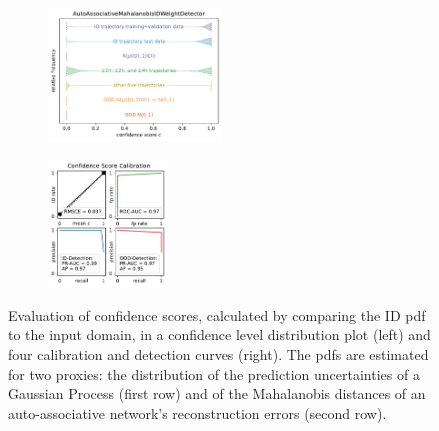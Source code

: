 \begin{figure}[H]
    \begin{subfigure}
        \centering
        \includegraphics[width=0.505\textwidth,valign=t]{ood-detection/figures/confidence-score/ood.autoassociativemahalanobisidweightdetector-distribution.pdf}
    \end{subfigure}
    \begin{subfigure}
        \centering
        \includegraphics[width=0.345\textwidth,valign=t]{ood-detection/figures/confidence-score/ood.autoassociativemahalanobisidweightdetector-calibration.pdf}
    \end{subfigure}

    \caption[Evaluation of Confidence Scores from Comparing the ID pdf to the Input Domain]{Evaluation of confidence scores, calculated by comparing the ID pdf to the input domain, in a confidence level distribution plot (left) and four calibration and detection curves (right). The pdfs are estimated for two proxies: the distribution of the prediction uncertainties of a Gaussian Process (first row) and of the Mahalanobis distances of an auto-associative network's reconstruction errors (second row).}
    \label{fig:weighting-ood-scoring}
\end{figure}

